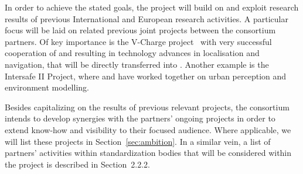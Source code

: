 
In order to achieve the stated goals, the \Project{} project will build on and exploit research results of previous International and European research activities.
A particular focus will be laid on related previous joint projects between the consortium partners. Of key importance is the V-Charge project~\cite{vcharge} with very successful cooperation of \VW and \ETHZ resulting in technology advances in localisation and navigation, that will be directly transferred into \Project. Another example is the Intersafe II Project, where \VW and \CLUJ have worked together on urban perception and environment modelling. 

Besides capitalizing on the results of previous relevant projects, the \Project{} consortium intends to develop synergies with the partners' ongoing projects in order to extend know-how and visibility to their focused audience. Where applicable, we will list these projects in Section~\ref{sec:ambition}. In a similar vein, a list of partners' activities within standardization bodies that will be considered within the project is described in Section~2.2.2.
